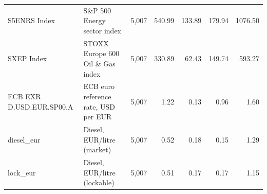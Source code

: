 \begin{tabular}{llrrrrr}
S5ENRS Index & S\&P 500 Energy sector index & 5,007 & 540.99 & 133.89 & 179.94 & 1076.50 \\
SXEP Index & STOXX Europe 600 Oil \& Gas index & 5,007 & 330.89 & 62.43 & 149.74 & 593.27 \\
ECB EXR D.USD.EUR.SP00.A & ECB euro reference rate, USD per EUR & 5,007 & 1.22 & 0.13 & 0.96 & 1.60 \\
diesel\_eur & Diesel, EUR/litre (market) & 5,007 & 0.52 & 0.18 & 0.15 & 1.29 \\
lock\_eur & Diesel, EUR/litre (lockable) & 5,007 & 0.51 & 0.17 & 0.17 & 1.15 \\
\bottomrule
\end{tabular}
